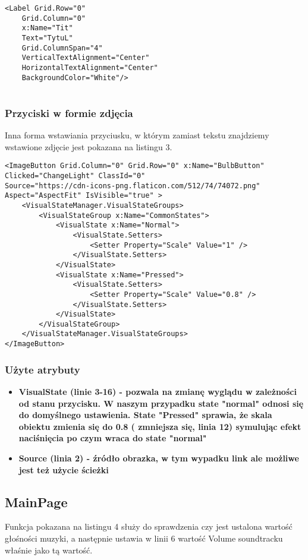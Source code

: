 \begin{lstlisting}[caption=Label]
	<Label Grid.Row="0" 
	Grid.Column="0" 
	x:Name="Tit" 
	Text="TytuL" 
	Grid.ColumnSpan="4" 
	VerticalTextAlignment="Center" 
	HorizontalTextAlignment="Center" 
	BackgroundColor="White"/>
	
\end{lstlisting}
\subsubsection{Przyciski w formie zdjęcia}
\hspace{0.60cm}Inna forma wstawiania przyciusku, w którym zamiast tekstu znajdziemy wstawione zdjęcie jest pokazana na listingu 3.
\begin{lstlisting}[caption=ImageButton]
<ImageButton Grid.Column="0" Grid.Row="0" x:Name="BulbButton" Clicked="ChangeLight" ClassId="0" 
Source="https://cdn-icons-png.flaticon.com/512/74/74072.png" Aspect="AspectFit" IsVisible="true" >
	<VisualStateManager.VisualStateGroups>
		<VisualStateGroup x:Name="CommonStates">
			<VisualState x:Name="Normal">
				<VisualState.Setters>
					<Setter Property="Scale" Value="1" />
				</VisualState.Setters>
			</VisualState>
			<VisualState x:Name="Pressed">
				<VisualState.Setters>
					<Setter Property="Scale" Value="0.8" />
				</VisualState.Setters>
			</VisualState>
		</VisualStateGroup>
	</VisualStateManager.VisualStateGroups>
</ImageButton>
\end{lstlisting}

\subsubsection{Użyte atrybuty}
\begin{itemize}
	\item \textbf{VisualState  (linie 3-16) - pozwala na zmianę wyglądu w zależności od stanu przycisku. W naszym przypadku state "normal" odnosi się do domyślnego ustawienia. State "Pressed" sprawia, że skala obiektu zmienia się do 0.8 ( zmniejsza się, linia 12) symulując efekt naciśnięcia po czym wraca do state "normal" }
	\item \textbf{Source (linia 2) - źródło obrazka, w tym wypadku link ale możliwe jest też użycie ścieżki }
\end{itemize}
\subsection{MainPage}
\hspace{0.60cm}Funkcja pokazana na listingu 4 służy do sprawdzenia czy jest ustalona wartość głośności muzyki, a następnie ustawia w linii 6 wartość Volume soundtracku właśnie jako tą wartość.

